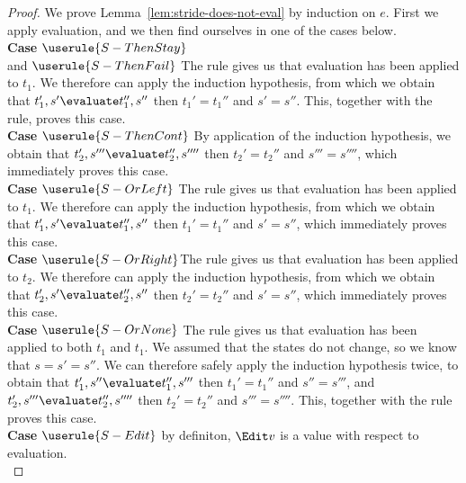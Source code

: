 \begin{proof}
  We prove Lemma~\ref{lem:stride-does-not-eval} by induction on $e$. First we
  apply evaluation, and we then find ourselves in one of the cases below.\\

  \noindent\textbf{Case} $\userule{S-ThenStay}$\\
  and $\userule{S-ThenFail}$ The  rule gives us that evaluation
  has been applied to $t_1$. We therefore can apply the induction hypothesis,
  from which we obtain that $t_1',s'\evaluate t_1'',s''$ then $t_1'=t_1''$ and
  $s'=s''$. This, together with the  rule, proves this case.\\

  \noindent\textbf{Case} $\userule{S-ThenCont}$ By application of the induction
  hypothesis, we obtain that $t_2',s'''\evaluate t_2'',s''''$ then $t_2'=t_2''$
  and $s'''=s''''$, which immediately proves this case.\\

  \noindent\textbf{Case} $\userule{S-OrLeft}$ The  rule gives us
  that evaluation has been applied to $t_1$. We therefore can apply the
  induction hypothesis, from which we obtain that $t_1',s'\evaluate t_1'',s''$
  then $t_1'=t_1''$ and $s'=s''$, which immediately proves this case.\\

  \noindent\textbf{Case} $\userule{S-OrRight}$The  rule gives us
  that evaluation has been applied to $t_2$. We therefore can apply the
  induction hypothesis, from which we obtain that $t_2',s'\evaluate t_2'',s''$
  then $t_2'=t_2''$ and $s'=s''$, which immediately proves this case.\\

  \noindent\textbf{Case} $\userule{S-OrNone}$ The  rule gives us
  that evaluation has been applied to both $t_1$ and $t_1$. We assumed that the
  states do not change, so we know that $s=s'=s''$. We can therefore safely
  apply the induction hypothesis twice, to obtain that
  $t_1',s''\evaluate t_1'',s'''$ then $t_1'=t_1''$ and $s''=s'''$, and
  $t_2',s'''\evaluate t_2'',s''''$ then $t_2'=t_2''$ and $s'''=s''''$. This,
  together with the  rule proves this case.\\

  \noindent\textbf{Case} $\userule{S-Edit}$ by definiton, $\Edit v$ is a value
  with respect to evaluation.\\


\end{proof}
